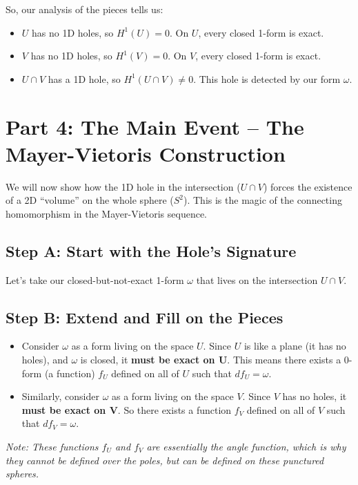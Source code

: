 \documentclass[12pt, letterpaper]{article}
\begin{document}
	\begin{center}
	\end{center}
	
	So, our analysis of the pieces tells us:
	\begin{itemize}
		\item $U$ has no 1D holes, so $H^1(U) = 0$. On $U$, every closed 1-form is exact.
		\item $V$ has no 1D holes, so $H^1(V) = 0$. On $V$, every closed 1-form is exact.
		\item $U \cap V$ has a 1D hole, so $H^1(U \cap V) \neq 0$. This hole is detected by our form $\omega$.
	\end{itemize}
	
	\section{Part 4: The Main Event -- The Mayer-Vietoris Construction}
	
	We will now show how the 1D hole in the intersection ($U \cap V$) forces the existence of a 2D ``volume'' on the whole sphere ($S^2$). This is the magic of the connecting homomorphism in the Mayer-Vietoris sequence.
	
	\subsection{Step A: Start with the Hole's Signature}
	Let's take our closed-but-not-exact 1-form $\omega$ that lives on the intersection $U \cap V$.
	
	\subsection{Step B: Extend and Fill on the Pieces}
	\begin{itemize}
		\item Consider $\omega$ as a form living on the space $U$. Since $U$ is like a plane (it has no holes), and $\omega$ is closed, it \textbf{must be exact on U}. This means there exists a 0-form (a function) $f_U$ defined on all of $U$ such that $df_U = \omega$.
		\item Similarly, consider $\omega$ as a form living on the space $V$. Since $V$ has no holes, it \textbf{must be exact on V}. So there exists a function $f_V$ defined on all of $V$ such that $df_V = \omega$.
	\end{itemize}
	\textit{Note: These functions $f_U$ and $f_V$ are essentially the angle function, which is why they cannot be defined over the poles, but can be defined on these punctured spheres.}
	
\end{document}
